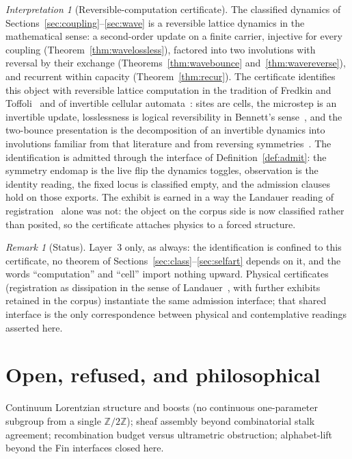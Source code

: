 \documentclass[11pt,a4paper]{article}
\theoremstyle{plain}
\theoremstyle{definition}
\theoremstyle{remark}
\newtheorem{remark}[theorem]{Remark}
\newtheorem{interpretation}[theorem]{Interpretation}
\newcommand{\Ztwo}{\mathbb{Z}/2\mathbb{Z}}
\begin{document}
\begin{interpretation}[Reversible-computation certificate]
\label{int:dict2}
The classified dynamics of
Sections~\ref{sec:coupling}--\ref{sec:wave} is a reversible lattice
dynamics in the mathematical sense: a second-order update on a finite
carrier, injective for every coupling
(Theorem~\ref{thm:wavelossless}), factored into two involutions with
reversal by their exchange (Theorems~\ref{thm:wavebounce}
and~\ref{thm:wavereverse}), and recurrent within capacity
(Theorem~\ref{thm:recur}). The certificate identifies this object
with reversible lattice computation in the tradition of Fredkin and
Toffoli~\cite{fredkintoffoli} and of invertible cellular
automata~\cite{toffolimargolus,margolus}: sites are cells, the
microstep is an invertible update, losslessness is logical
reversibility in Bennett's sense~\cite{bennett}, and the two-bounce
presentation is the decomposition of an invertible dynamics into
involutions familiar from that literature and from reversing
symmetries~\cite{lambroberts}. The identification is admitted through
the interface of Definition~\ref{def:admit}: the symmetry endomap is
the live flip the dynamics toggles, observation is the identity
reading, the fixed locus is classified empty, and the admission
clauses hold on those exports. The exhibit is earned in a way the
Landauer reading of registration~\cite{landauer} alone was not: the
object on the corpus side is now classified rather than posited, so
the certificate attaches physics to a forced structure.
\end{interpretation}

\begin{remark}[Status]
Layer~3 only, as always: the identification is confined to this
certificate, no theorem of
Sections~\ref{sec:class}--\ref{sec:selfart} depends on it, and the
words ``computation'' and ``cell'' import nothing upward. Physical
certificates (registration as dissipation in the sense of
Landauer~\cite{landauer}, with further exhibits retained in the
corpus) instantiate the same admission interface; that shared
interface is the only correspondence between physical and
contemplative readings asserted here.
\end{remark}


\section{Open, refused, and philosophical}
\label{sec:status}

\begin{statusopen}
Continuum Lorentzian structure and boosts (no continuous
one-parameter subgroup from a single $\Ztwo$); sheaf assembly beyond
combinatorial stalk agreement; recombination budget versus
ultrametric obstruction; alphabet-lift beyond the Fin interfaces
closed here.
\end{statusopen}
\end{document}
